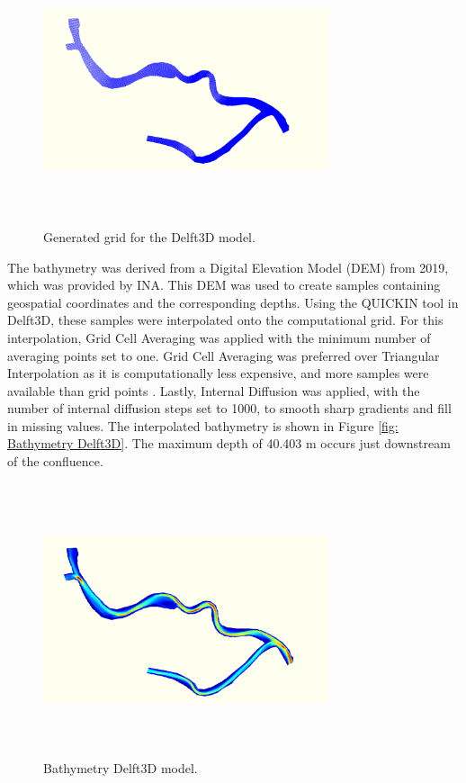 \begin{figure}[h]
    \centering
    \includegraphics[width=0.75\textwidth, height=8cm]{figures/ch7/Grid_Guazu.png}
    \caption{Generated grid for the Delft3D model.}
    \label{fig:Grid_Guazu_Delft3D}
\end{figure}


The bathymetry was derived from a Digital Elevation Model (DEM) from 2019, which was provided by INA. This DEM was used to create samples containing geospatial coordinates and the corresponding depths. Using the QUICKIN tool in Delft3D, these samples were interpolated onto the computational grid. For this interpolation, Grid Cell Averaging was applied with the minimum number of averaging points set to one. Grid Cell Averaging was preferred over Triangular Interpolation as it is computationally less expensive, and more samples were available than grid points \autocite{deltaresQUICKINUserManual2025}. Lastly, Internal Diffusion was applied, with the number of internal diffusion steps set to 1000, to smooth sharp gradients and fill in missing values. The interpolated bathymetry is shown in Figure \ref{fig: Bathymetry Delft3D}. The maximum depth of 40.403 m occurs just downstream of the confluence. 

\begin{figure}[H]
    \centering
    \includegraphics[width=0.75\textwidth, height=8cm]{figures/ch7/Bathymetry_Gueazu_Delft3D.png}
    \caption{Bathymetry Delft3D model.}
    \label{fig:Bathymetry_Delft3D}
\end{figure}

